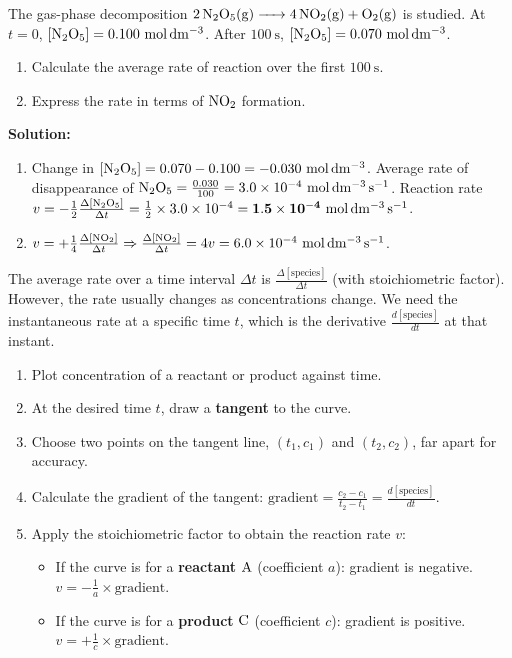\documentclass[11pt]{article}
\newcommand{\cle}[1]{{\popxbold\color{popdark}#1}}
\begin{document}
\begin{exemplebox}
The gas-phase decomposition $\ce{2N2O5(g) -> 4NO2(g) + O2(g)}$ is studied. At $t = 0$, $[\ce{N2O5}] = 0.100\ \mathrm{mol\,dm^{-3}}$. After $100\ \mathrm{s}$, $[\ce{N2O5}] = 0.070\ \mathrm{mol\,dm^{-3}}$.
\begin{enumerate}
\item Calculate the average rate of reaction over the first $100\ \mathrm{s}$.
\item Express the rate in terms of $\ce{NO2}$ formation.
\end{enumerate}
\tcblower
\textbf{Solution:}
\begin{enumerate}
\item Change in $[\ce{N2O5}] = 0.070 - 0.100 = -0.030\ \mathrm{mol\,dm^{-3}}$.
Average rate of disappearance of $\ce{N2O5} = \frac{0.030}{100} = 3.0 \times 10^{-4}\ \mathrm{mol\,dm^{-3}\,s^{-1}}$.
Reaction rate $v = -\frac{1}{2}\frac{\Delta[\ce{N2O5}]}{\Delta t} = \frac{1}{2} \times 3.0 \times 10^{-4} = \mathbf{1.5 \times 10^{-4}\ \mathrm{mol\,dm^{-3}\,s^{-1}}}$.
\item $v = +\frac{1}{4}\frac{\Delta[\ce{NO2}]}{\Delta t} \Rightarrow \frac{\Delta[\ce{NO2}]}{\Delta t} = 4v = 6.0 \times 10^{-4}\ \mathrm{mol\,dm^{-3}\,s^{-1}}$.
\end{enumerate}
\end{exemplebox}

The \cle{average rate} over a time interval $\Delta t$ is $\frac{\Delta[\text{species}]}{\Delta t}$ (with stoichiometric factor). However, the rate usually changes as concentrations change. We need the \cle{instantaneous rate} at a specific time $t$, which is the derivative $\frac{d[\text{species}]}{dt}$ at that instant.

\begin{methode}
\begin{enumerate}
\item Plot concentration of a reactant or product against time.
\item At the desired time $t$, draw a \textbf{tangent} to the curve.
\item Choose two points on the tangent line, $(t_1, c_1)$ and $(t_2, c_2)$, far apart for accuracy.
\item Calculate the gradient of the tangent: $\text{gradient} = \frac{c_2 - c_1}{t_2 - t_1} = \frac{d[\text{species}]}{dt}$.
\item Apply the stoichiometric factor to obtain the reaction rate $v$:
\begin{itemize}
\item If the curve is for a \textbf{reactant} $\ce{A}$ (coefficient $a$): gradient is negative. $v = -\frac{1}{a} \times \text{gradient}$.
\item If the curve is for a \textbf{product} $\ce{C}$ (coefficient $c$): gradient is positive. $v = +\frac{1}{c} \times \text{gradient}$.
\end{itemize}
\end{enumerate}
\end{methode}
\end{document}
